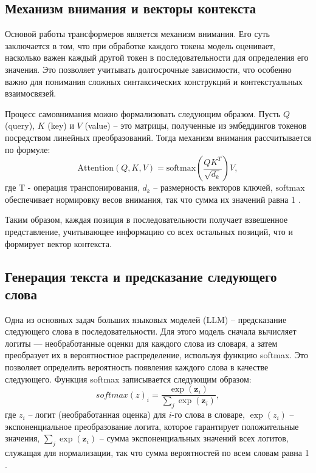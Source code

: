 \subsection{Механизм внимания и векторы контекста}

Основой работы трансформеров является механизм внимания. 
Его суть заключается в том, что при обработке каждого токена модель оценивает, насколько важен каждый другой токен в последовательности для определения его значения. 
Это позволяет учитывать долгосрочные зависимости, что особенно важно для понимания сложных синтаксических конструкций и контекстуальных взаимосвязей.

Процесс самовнимания можно формализовать следующим образом. 
Пусть \(Q\) (query), \(K\) (key) и \(V\) (value) – это матрицы, полученные из эмбеддингов токенов посредством линейных преобразований. 
Тогда механизм внимания рассчитывается по формуле:
\[
\text{Attention}(Q, K, V) = \text{softmax}\left(\frac{QK^T}{\sqrt{d_k}}\right)V,
\] 
где
T - операция транспонирования,
\(d_k\) – размерность векторов ключей,
\(\text{softmax}\) обеспечивает нормировку весов внимания, так что сумма их значений равна 1 \cite{lib:attention_is_all_you_need}.

Таким образом, каждая позиция в последовательности получает взвешенное представление, учитывающее информацию со всех остальных позиций, что и формирует вектор контекста.

\subsection{Генерация текста и предсказание следующего слова}

Одна из основных задач больших языковых моделей (LLM) – предсказание следующего слова в последовательности. Для этого модель сначала вычисляет логиты — необработанные оценки для каждого слова из словаря, а затем преобразует их в вероятностное распределение, используя функцию softmax. Это позволяет определить вероятность появления каждого слова в качестве следующего.
Функция softmax записывается следующим образом:
\[
softmax(z)_{i} = \frac{\exp\left(\mathbf{z}_{i}\right)}{\sum_{j} \exp\left(\mathbf{z}_i\right)},
\]
где
$z_{i}$ -- логит (необработанная оценка) для $i$-го слова в словаре,
$\exp({z}_{i})$ -- экспоненциальное преобразование логита, которое гарантирует положительные значения,
$\sum_{j} \exp(\mathbf{z}_i)$ -- сумма экспоненциальных значений всех логитов, служащая для нормализации, так что сумма вероятностей по всем словам равна 1 \cite{anal:softmax}.

